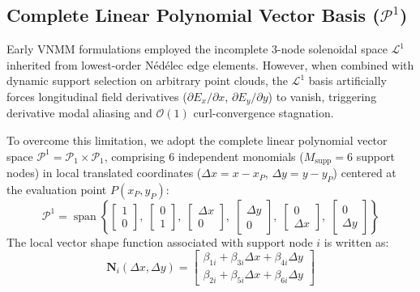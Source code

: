 \documentclass[11pt,a4paper]{article}
\begin{document}
\subsection{Complete Linear Polynomial Vector Basis (\texorpdfstring{$\mathcal{P}^1$}{P1})}
Early VNMM formulations employed the incomplete 3-node solenoidal space $\mathcal{L}^1$ inherited from lowest-order N\'ed\'elec edge elements. However, when combined with dynamic support selection on arbitrary point clouds, the $\mathcal{L}^1$ basis artificially forces longitudinal field derivatives ($\partial E_x/\partial x$, $\partial E_y/\partial y$) to vanish, triggering derivative modal aliasing and $\mathcal{O}(1)$ curl-convergence stagnation.

To overcome this limitation, we adopt the complete linear polynomial vector space $\mathcal{P}^1 = \mathcal{P}_1 \times \mathcal{P}_1$, comprising 6 independent monomials ($M_{\mathrm{supp}} = 6$ support nodes) in local translated coordinates ($\Delta x = x - x_P$, $\Delta y = y - y_P$) centered at the evaluation point $P(x_P, y_P)$:
\begin{equation}
\mathcal{P}^1 = \operatorname{span}\left\{
\begin{bmatrix} 1 \\ 0 \end{bmatrix}, \;
\begin{bmatrix} 0 \\ 1 \end{bmatrix}, \;
\begin{bmatrix} \Delta x \\ 0 \end{bmatrix}, \;
\begin{bmatrix} \Delta y \\ 0 \end{bmatrix}, \;
\begin{bmatrix} 0 \\ \Delta x \end{bmatrix}, \;
\begin{bmatrix} 0 \\ \Delta y \end{bmatrix}
\right\}
\end{equation}
The local vector shape function associated with support node $i$ is written as:
\begin{equation}
\mathbf{N}_i(\Delta x, \Delta y) = \begin{bmatrix} \beta_{1i} + \beta_{3i}\Delta x + \beta_{4i}\Delta y \\ \beta_{2i} + \beta_{5i}\Delta x + \beta_{6i}\Delta y \end{bmatrix}
\end{equation}
\end{document}
